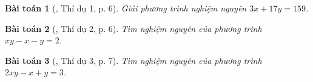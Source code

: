 \documentclass{article}
\numberwithin{equation}{section}
\newtheorem{baitoan}{Bài toán}[section]
\begin{document}
\begin{baitoan}[\cite{Binh_PTNN}, Thí dụ 1, p. 6]
	Giải phương trình nghiệm nguyên $3x + 17y = 159$.
\end{baitoan}

\begin{baitoan}[\cite{Binh_PTNN}, Thí dụ 2, p. 6]
	Tìm nghiệm nguyên của phương trình $xy - x - y = 2$.
\end{baitoan}

\begin{baitoan}[\cite{Binh_PTNN}, Thí dụ 3, p. 7]
	Tìm nghiệm nguyên của phương trình $2xy - x + y = 3$.
\end{baitoan}


\printbibliography[heading=bibintoc]
	
\end{document}
